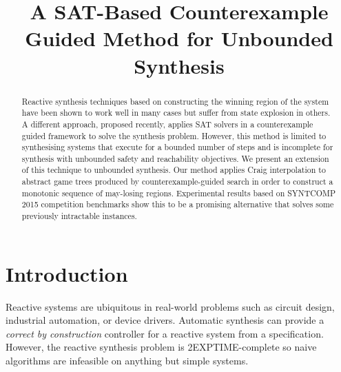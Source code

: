 \documentclass{llncs}
\begin{document}
\title{A SAT-Based Counterexample Guided Method for Unbounded Synthesis}

\author{}
\institute{}

%

\maketitle

\sloppy

\begin{abstract}

    Reactive synthesis techniques based on constructing the winning region of
    the system have been shown to work well in many cases but suffer from state
    explosion in others.  A different approach, proposed recently, applies SAT
    solvers in a counterexample guided framework to solve the synthesis
    problem.  However, this method is limited to synthesising systems that
    execute for a bounded number of steps and is incomplete for synthesis with
    unbounded safety and reachability objectives.  We present an extension of
    this technique to unbounded synthesis.  Our method applies Craig
    interpolation to abstract game trees produced by counterexample-guided
    search in order to construct a monotonic sequence of may-losing regions.
    Experimental results based on SYNTCOMP 2015 competition benchmarks show
    this to be a promising alternative that solves some previously intractable
    instances.

\end{abstract}

\section{Introduction}

Reactive systems are ubiquitous in real-world problems such as circuit design,
industrial automation, or device drivers. Automatic synthesis can provide a
\emph{correct by construction} controller for a reactive system from a
specification.  However, the reactive synthesis problem is 2EXPTIME-complete so
naive algorithms are infeasible on anything but simple systems.
\end{document}
